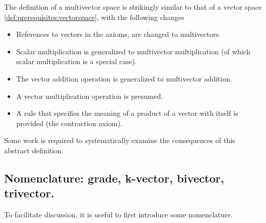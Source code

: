 The definition of a multivector space is strikingly similar to that of a vector space
\cref{def:prerequisites:vectorspace}, with the following changes

\begin{itemize}
\item References to vectors in the axioms, are changed to multivectors.
\item Scalar multiplication is generalized to multivector multiplication (of which scalar multiplication is a special case).
\item The vector addition operation is generalized to multivector addition.
\item A vector multiplication operation is presumed.
\item A rule that specifies the meaning of a product of a vector with itself is provided (the contraction axiom).
\end{itemize}

Some work is required to systematically examine the consequences of this abstract definition.

\subsection{Nomenclature: grade, k-vector, bivector, trivector.}

To facilitate discussion, it is useful to first introduce some nomenclature.

%


